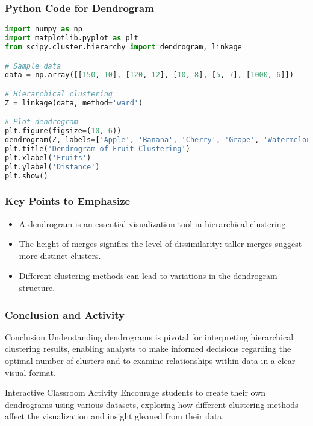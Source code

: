 \documentclass[aspectratio=169]{beamer}
\begin{document}
\begin{frame}[fragile]
    \frametitle{Python Code for Dendrogram}
    \begin{lstlisting}[language=Python]
import numpy as np
import matplotlib.pyplot as plt
from scipy.cluster.hierarchy import dendrogram, linkage

# Sample data
data = np.array([[150, 10], [120, 12], [10, 8], [5, 7], [1000, 6]])

# Hierarchical clustering
Z = linkage(data, method='ward')

# Plot dendrogram
plt.figure(figsize=(10, 6))
dendrogram(Z, labels=['Apple', 'Banana', 'Cherry', 'Grape', 'Watermelon'])
plt.title('Dendrogram of Fruit Clustering')
plt.xlabel('Fruits')
plt.ylabel('Distance')
plt.show()
    \end{lstlisting}
\end{frame}

\begin{frame}[fragile]
    \frametitle{Key Points to Emphasize}
    \begin{itemize}
        \item A dendrogram is an essential visualization tool in hierarchical clustering.
        \item The height of merges signifies the level of dissimilarity: taller merges suggest more distinct clusters.
        \item Different clustering methods can lead to variations in the dendrogram structure.
    \end{itemize}
\end{frame}

\begin{frame}[fragile]
    \frametitle{Conclusion and Activity}
    \begin{block}{Conclusion}
        Understanding dendrograms is pivotal for interpreting hierarchical clustering results, enabling analysts to make informed decisions regarding the optimal number of clusters and to examine relationships within data in a clear visual format.
    \end{block}
    
    \begin{block}{Interactive Classroom Activity}
        Encourage students to create their own dendrograms using various datasets, exploring how different clustering methods affect the visualization and insight gleaned from their data.
    \end{block}
\end{frame}
\end{document}
